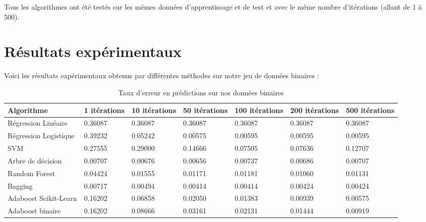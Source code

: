 \documentclass{article}
\begin{document}
Tous les algorithmes ont été testés sur les mêmes données d'apprentissage et de test et avec le même nombre d'itérations (allant de 1 à 500). 





\section{Résultats expérimentaux}
Voici les résultats expérimentaux obtenus par différentes méthodes sur notre jeu de données binaires  :

\begin{table}[htbp]
    \centering
    \small
    \setlength\tabcolsep{2pt}
    \begin{tabular}{| l | l | l | l | l | l | l |}
    \hline
    Algorithme & 1 itérations & 10 itérations & 50 itérations & 100 itérations & 200 itérations & 500 itérations \\ \hline
    Régression Linéaire & 0.36087 &  0.36087 &  0.36087 & 0.36087 & 0.36087 & 0.36087 \\ \hline
    Régression Logistique & 0.39232 & 0.05242 & 0.00575 & 0.00595 &  0.00595 & 0.00595 \\ \hline
    SVM & 0.27555 & 0.29000 & 0.14666 & 0.07505 & 0.07636 & 0.12707 \\ \hline
    Arbre de décision & 0.00707 & 0.00676 & 0.00656 & 0.00737 & 0.00686 & 0.00707\\ \hline
    Random Forest &  0.04424 & 0.01555 & 0.01171 & 0.01181 & 0.01060 &  0.01131  \\ \hline
    Bagging & 0.00717 & 0.00494 & 0.00414 & 0.00414 & 0.00424 & 0.00424\\ \hline
    Adaboost Scikit-Learn & 0.16202 & 0.06858 &  0.02050 & 0.01383 & 0.00939 & 0.00575\\ \hline
    Adaboost binaire & 0.16202 & 0.08666 & 0.03161 & 0.02131 & 0.01444 & 0.00919\\
    \hline
    \end{tabular}
    \caption{Taux d'erreur en prédictions sur nos données binaires}
\end{table}
\end{document}
